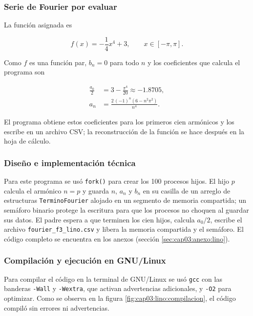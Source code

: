 \subsubsection{Serie de Fourier por evaluar}
\label{sec:cap03:lino:serie}

La función asignada es

\begin{equation}
    f(x) = -\frac{1}{4}x^{4} + 3,
    \qquad x \in [-\pi, \pi].
    \label{eq:cap03:lino:funcion}
\end{equation}

Como $f$ es una función par, $b_n = 0$ para todo $n$ y los coeficientes que calcula el programa son

\begin{align}
    \frac{a_0}{2} &= 3 - \frac{\pi^{4}}{20} \approx -1.8705, \label{eq:cap03:lino:a0}\\[4pt]
    a_n &= \frac{2\,(-1)^{n}\left(6 - n^{2}\pi^{2}\right)}{n^{4}}. \label{eq:cap03:lino:an}
\end{align}

El programa obtiene estos coeficientes para los primeros cien armónicos y los escribe en un archivo CSV; la reconstrucción de la función se hace después en la hoja de cálculo.

\subsubsection{Diseño e implementación técnica}
\label{sec:cap03:lino:diseno}

Para este programa se usó \texttt{fork()} para crear los 100 procesos hijos. El hijo $p$ calcula el armónico $n = p$ y guarda $n$, $a_n$ y $b_n$ en su casilla de un arreglo de estructuras \texttt{TerminoFourier} alojado en un segmento de memoria compartida; un semáforo binario protege la escritura para que los procesos no choquen al guardar sus datos. El padre espera a que terminen los cien hijos, calcula $a_0/2$, escribe el archivo \texttt{fourier\_f3\_lino.csv} y libera la memoria compartida y el semáforo. El código completo se encuentra en los anexos (sección \ref{sec:cap03:anexo:lino}).

\subsubsection{Compilación y ejecución en GNU/Linux}
\label{sec:cap03:lino:ejecucion}

Para compilar el código en la terminal de GNU/Linux se usó \texttt{gcc} con las banderas \texttt{-Wall} y \texttt{-Wextra}, que activan advertencias adicionales, y \texttt{-O2} para optimizar. Como se observa en la figura \ref{fig:cap03:lino:compilacion}, el código compiló sin errores ni advertencias.

